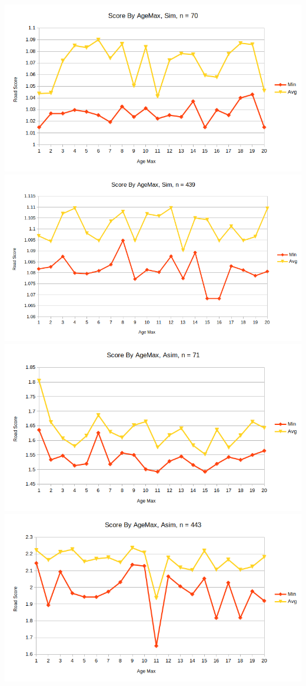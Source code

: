 \documentclass{article}
\begin{document}
\includegraphics[scale=0.33]{ageSim70}
\includegraphics[scale=0.33]{ageSim439}
\includegraphics[scale=0.33]{ageAsim71}
\includegraphics[scale=0.33]{ageAsim443}
\end{document}
